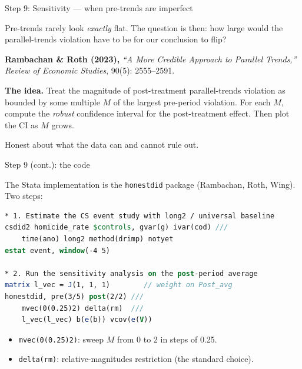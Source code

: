 \documentclass[aspectratio=169,12pt,t]{beamer}
\begin{document}
\begin{frame}{Step 9: Sensitivity --- when pre-trends are imperfect}
\vspace{0.4cm}

Pre-trends rarely look \textit{exactly} flat. \;The question is then: \;how large would the parallel-trends violation have to be for our conclusion to flip?

\vspace{0.4cm}

\textbf{Rambachan \& Roth (2023),} \;\textit{``A More Credible Approach to Parallel Trends,''} \;\textit{Review of Economic Studies}, 90(5): 2555--2591.

\vspace{0.4cm}

\textbf{The idea.} \;Treat the magnitude of post-treatment parallel-trends violation as bounded by some multiple $M$ of the largest pre-period violation. \;For each $M$, compute the \textit{robust} confidence interval for the post-treatment effect. \;Then plot the CI as $M$ grows.

\vspace{0.4em}
 \;Honest about what the data can and cannot rule out.
\end{frame}

\begin{frame}[fragile]{Step 9 (cont.): the code}
\vspace{0.15cm}

The Stata implementation is the \texttt{honestdid} package (Rambachan, Roth, Wing). \;Two steps:

\begin{lstlisting}[language=Stata]
* 1. Estimate the CS event study with long2 / universal baseline
csdid2 homicide_rate $controls, gvar(g) ivar(cod) ///
    time(ano) long2 method(drimp) notyet
estat event, window(-4 5)

* 2. Run the sensitivity analysis on the post-period average
matrix l_vec = J(1, 1, 1)        // weight on Post_avg
honestdid, pre(3/5) post(2/2) ///
    mvec(0(0.25)2) delta(rm)  ///
    l_vec(l_vec) b(e(b)) vcov(e(V))
\end{lstlisting}

\vspace{0.1em}
\begin{itemize}\scriptsize\setlength\itemsep{0pt}
  \item \texttt{mvec(0(0.25)2)}: sweep $M$ from 0 to 2 in steps of 0.25.
  \item \texttt{delta(rm)}: relative-magnitudes restriction (the standard choice).
\end{itemize}
\end{frame}
\end{document}
